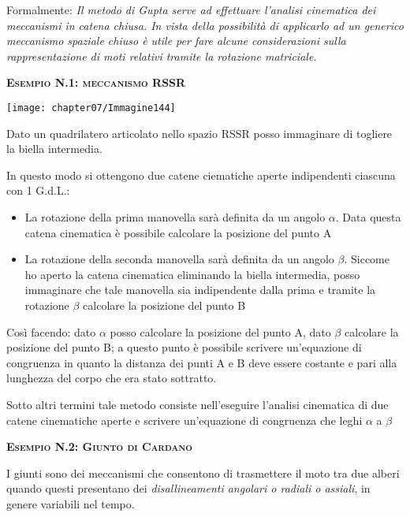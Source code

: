 Formalmente: \emph{Il metodo di Gupta serve ad effettuare l'analisi cinematica dei meccanismi in catena chiusa. In vista della possibilità di applicarlo ad un generico meccanismo spaziale chiuso è utile per fare alcune considerazioni sulla rappresentazione di moti relativi tramite la rotazione matriciale.}

\begin{center}
{\scshape{\bfseries Esempio N.1: meccanismo RSSR}}
\end{center}


\begin{minipage}{.5\textwidth}
\centering
\texttt{[image: chapter07/Immagine144]}
\end{minipage}
\hfill
\begin{minipage}{.5\textwidth}
Dato un quadrilatero articolato nello spazio RSSR posso immaginare di togliere la biella intermedia.

In questo modo si ottengono due catene ciematiche aperte indipendenti ciascuna con 1 G.d.L.: 
\begin{itemize}
\item La rotazione della prima manovella sarà definita da un angolo $\alpha$. Data questa catena cinematica è possibile calcolare la posizione del punto A
\item La rotazione della seconda manovella sarà definita da un angolo $\beta$. Siccome ho aperto la catena cinematica eliminando la biella intermedia, posso immaginare che tale manovella sia indipendente dalla prima e tramite la rotazione $\beta$ calcolare la posizione del punto B
\end{itemize}
\end{minipage}

Così facendo: dato $\alpha$ posso calcolare la posizione del punto A, dato $\beta$ calcolare la posizione del punto B; a questo punto è possibile scrivere un'equazione di congruenza in quanto la distanza dei punti A e B deve essere costante e pari alla lunghezza del corpo che era stato sottratto.

Sotto altri termini tale metodo consiste nell'eseguire l'analisi cinematica di due catene cinematiche aperte e scrivere un'equazione di congruenza che leghi $\alpha$ a $\beta$

\begin{center}
{\scshape{\bfseries Esempio N.2: Giunto di Cardano}}
\end{center}

I giunti sono dei meccanismi che consentono di trasmettere il moto tra due alberi quando questi presentano dei \emph{disallineamenti angolari o radiali o assiali}, in genere variabili nel tempo.

